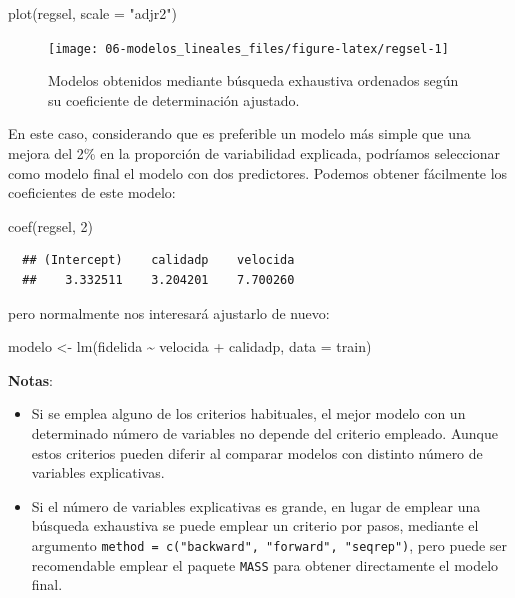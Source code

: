 \documentclass[
]{book}
\newenvironment{Shaded}{\begin{snugshade}}{\end{snugshade}}
\newcommand{\AttributeTok}[1]{\textcolor[rgb]{0.77,0.63,0.00}{#1}}
\newcommand{\DecValTok}[1]{\textcolor[rgb]{0.00,0.00,0.81}{#1}}
\newcommand{\FunctionTok}[1]{\textcolor[rgb]{0.00,0.00,0.00}{#1}}
\newcommand{\NormalTok}[1]{#1}
\newcommand{\OtherTok}[1]{\textcolor[rgb]{0.56,0.35,0.01}{#1}}
\newcommand{\SpecialCharTok}[1]{\textcolor[rgb]{0.00,0.00,0.00}{#1}}
\newcommand{\StringTok}[1]{\textcolor[rgb]{0.31,0.60,0.02}{#1}}
\theoremstyle{break}
\theoremstyle{nonumberplain}
\begin{document}
\begin{Shaded}
\begin{Highlighting}[]
\FunctionTok{plot}\NormalTok{(regsel, }\AttributeTok{scale =} \StringTok{"adjr2"}\NormalTok{)}
\end{Highlighting}
\end{Shaded}

\begin{figure}[!htb]

{\centering \texttt{[image: 06-modelos\_lineales\_files/figure-latex/regsel-1]} 

}

\caption{Modelos obtenidos mediante búsqueda exhaustiva ordenados según su coeficiente de determinación ajustado.}\label{fig:regsel}
\end{figure}

En este caso, considerando que es preferible un modelo más simple que una mejora del 2\% en la proporción de variabilidad explicada, podríamos seleccionar como modelo final el modelo con dos predictores.
Podemos obtener fácilmente los coeficientes de este modelo:

\begin{Shaded}
\begin{Highlighting}[]
\FunctionTok{coef}\NormalTok{(regsel, }\DecValTok{2}\NormalTok{)}
\end{Highlighting}
\end{Shaded}

\begin{verbatim}
  ## (Intercept)    calidadp    velocida 
  ##    3.332511    3.204201    7.700260
\end{verbatim}

pero normalmente nos interesará ajustarlo de nuevo:

\begin{Shaded}
\begin{Highlighting}[]
\NormalTok{modelo }\OtherTok{\textless{}{-}} \FunctionTok{lm}\NormalTok{(fidelida }\SpecialCharTok{\textasciitilde{}}\NormalTok{ velocida }\SpecialCharTok{+}\NormalTok{ calidadp, }\AttributeTok{data =}\NormalTok{ train)}
\end{Highlighting}
\end{Shaded}

\textbf{Notas}:

\begin{itemize}
\item
  Si se emplea alguno de los criterios habituales, el mejor modelo con un determinado
  número de variables no depende del criterio empleado.
  Aunque estos criterios pueden diferir al comparar modelos con distinto número de
  variables explicativas.
\item
  Si el número de variables explicativas es grande, en lugar de emplear una
  búsqueda exhaustiva se puede emplear un criterio por pasos, mediante el argumento
  \texttt{method\ =\ c("backward",\ "forward",\ "seqrep")}, pero puede ser recomendable
  emplear el paquete \texttt{MASS} para obtener directamente el modelo final.
\end{itemize}
\end{document}
